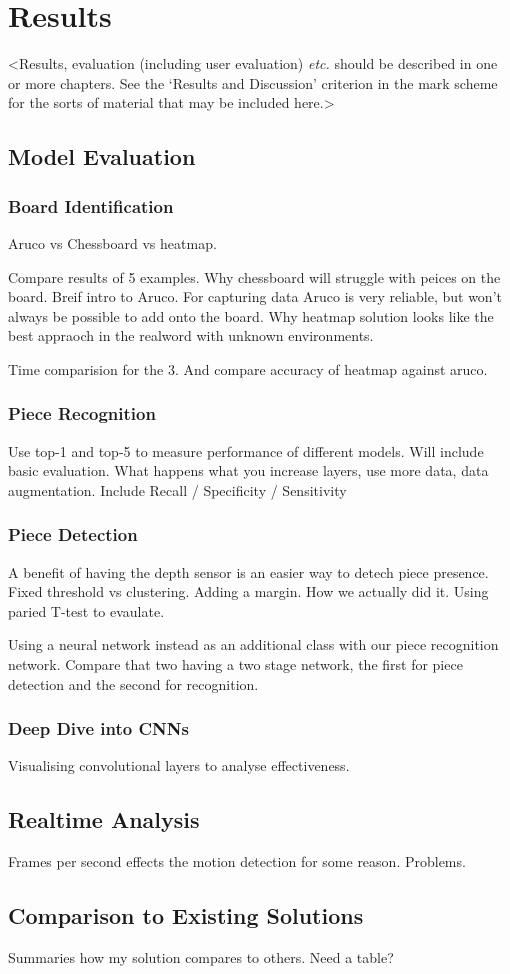 \chapter{Results}
\label{chapter3}

<Results, evaluation (including user evaluation) {\em etc.} should be described in one or more chapters. See the `Results and Discussion' criterion in the mark scheme for the sorts of material that may be included here.>

\section{Model Evaluation}

\subsection{Board Identification}
Aruco vs Chessboard vs heatmap. 

Compare results of 5 examples.  Why chessboard \cite{} will struggle with peices on the board.
Breif intro to Aruco.  For capturing data Aruco is very reliable, but won't always be possible to add onto the board.
Why heatmap solution looks like the best appraoch in the realword with unknown environments.  \cite{}

Time comparision for the 3.  And compare accuracy of heatmap against aruco.

\subsection{Piece Recognition}
Use top-1 and top-5 to measure performance of different models.
Will include basic evaluation.  What happens what you increase layers, use more data, data augmentation.
Include Recall / Specificity / Sensitivity

\subsection{Piece Detection}
A benefit of having the depth sensor is an easier way to detech piece presence.  
Fixed threshold vs clustering.  Adding a margin.  How we actually did it.
Using paried T-test to evaulate.

Using a neural network instead as an additional class with our piece recognition network.
Compare that two having a two stage network, the first for piece detection and the second for recognition.

\subsection{Deep Dive into CNNs}
Visualising convolutional layers to analyse effectiveness.

\section{Realtime Analysis}
Frames per second effects the motion detection for some reason.  Problems.

\section{Comparison to Existing Solutions}
Summaries how my solution compares to others.  Need a table?
